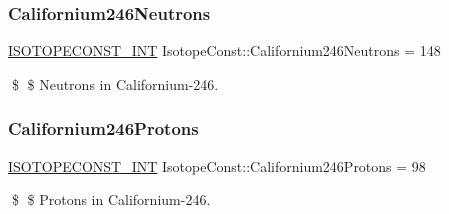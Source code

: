 \subsubsection{\texorpdfstring{Californium246\+Neutrons}{Californium246Neutrons}}
{\footnotesize\ttfamily \mbox{\hyperlink{group___isotope_const-_macros_ga5f18360b3e99483a35c32d789e62621c}{I\+S\+O\+T\+O\+P\+E\+C\+O\+N\+S\+T\+\_\+\+I\+NT}} Isotope\+Const\+::\+Californium246\+Neutrons = 148}

\$ \$ Neutrons in Californium-\/246. \mbox{\label{group___isotope_const-_californium-_cf246_ga988bdfb666f3835094c8015a3853ed23}} 
\subsubsection{\texorpdfstring{Californium246\+Protons}{Californium246Protons}}
{\footnotesize\ttfamily \mbox{\hyperlink{group___isotope_const-_macros_ga5f18360b3e99483a35c32d789e62621c}{I\+S\+O\+T\+O\+P\+E\+C\+O\+N\+S\+T\+\_\+\+I\+NT}} Isotope\+Const\+::\+Californium246\+Protons = 98}

\$ \$ Protons in Californium-\/246. 